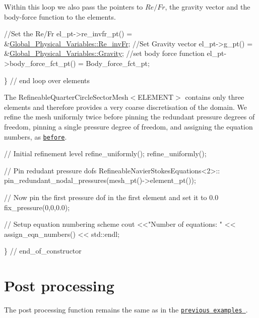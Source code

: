 Within this loop we also pass the pointers to $ Re/Fr $, the gravity vector and the body-\/force function to the elements.


\begin{DoxyCodeInclude}
   \textcolor{comment}{//Set the Re/Fr}
   el\_pt->re\_invfr\_pt() = &\hyperlink{namespaceGlobal__Physical__Variables_ab1a845a672b4d74b304639a976dc65c6}{Global\_Physical\_Variables::Re\_invFr};
   \textcolor{comment}{//Set Gravity vector}
   el\_pt->g\_pt() = &\hyperlink{namespaceGlobal__Physical__Variables_afae321364975eb56688ad13abc8ed6b7}{Global\_Physical\_Variables::Gravity};
   \textcolor{comment}{//set body force function}
   el\_pt->body\_force\_fct\_pt() = Body\_force\_fct\_pt;

  \} \textcolor{comment}{// end loop over elements}

\end{DoxyCodeInclude}


The {\ttfamily Refineable\+Quarter\+Circle\+Sector\+Mesh$<$\+E\+L\+E\+M\+E\+N\+T$>$} contains only three elements and therefore provides a very coarse discretisation of the domain. We refine the mesh uniformly twice before pinning the redundant pressure degrees of freedom, pinning a single pressure degree of freedom, and assigning the equation numbers, as \href{../../adaptive_driven_cavity/html/index.html#doc}{\tt before}.


\begin{DoxyCodeInclude}
 
 \textcolor{comment}{// Initial refinement level}
 refine\_uniformly();
 refine\_uniformly();

 \textcolor{comment}{// Pin redudant pressure dofs}
 RefineableNavierStokesEquations<2>::
  pin\_redundant\_nodal\_pressures(mesh\_pt()->element\_pt());
 
 \textcolor{comment}{// Now pin the first pressure dof in the first element and set it to 0.0}
 fix\_pressure(0,0,0.0);
 
 \textcolor{comment}{// Setup equation numbering scheme}
 cout <<\textcolor{stringliteral}{"Number of equations: "} << assign\_eqn\_numbers() << std::endl; 
 
\} \textcolor{comment}{// end\_of\_constructor}

\end{DoxyCodeInclude}




 

\hypertarget{index_doc}{}\section{Post processing}\label{index_doc}
The post processing function remains the same as in the \href{../../driven_cavity/html/index.html#doc}{\tt previous examples }.


